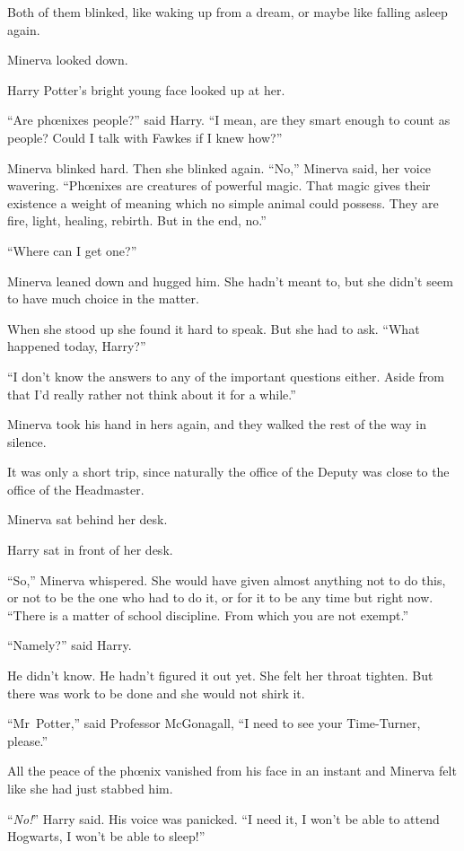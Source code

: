 Both of them blinked, like waking up from a dream, or maybe like falling asleep again.

Minerva looked down.

Harry Potter’s bright young face looked up at her.

“Are phœnixes people?” said Harry. “I mean, are they smart enough to count as people? Could I talk with Fawkes if I knew how?”

Minerva blinked hard. Then she blinked again. “No,” Minerva said, her voice wavering. “Phœnixes are creatures of powerful magic. That magic gives their existence a weight of meaning which no simple animal could possess. They are fire, light, healing, rebirth. But in the end, no.”

“Where can I get one?”

Minerva leaned down and hugged him. She hadn’t meant to, but she didn’t seem to have much choice in the matter.

When she stood up she found it hard to speak. But she had to ask. “What happened today, Harry?”

“I don’t know the answers to any of the important questions either. Aside from that I’d really rather not think about it for a while.”

Minerva took his hand in hers again, and they walked the rest of the way in silence.

It was only a short trip, since naturally the office of the Deputy was close to the office of the Headmaster.

Minerva sat behind her desk.

Harry sat in front of her desk.

“So,” Minerva whispered. She would have given almost anything not to do this, or not to be the one who had to do it, or for it to be any time but right now. “There is a matter of school discipline. From which you are not exempt.”

“Namely?” said Harry.

He didn’t know. He hadn’t figured it out yet. She felt her throat tighten. But there was work to be done and she would not shirk it.

“Mr~Potter,” said Professor McGonagall, “I need to see your Time-Turner, please.”

All the peace of the phœnix vanished from his face in an instant and Minerva felt like she had just stabbed him.

“\emph{No!}” Harry said. His voice was panicked. “I need it, I won’t be able to attend Hogwarts, I won’t be able to sleep!”

